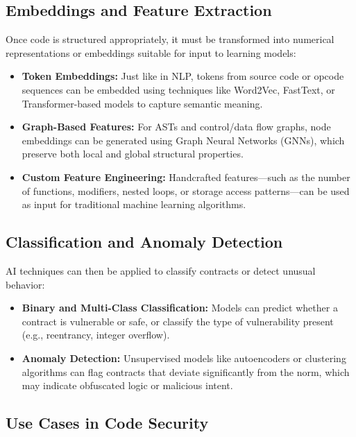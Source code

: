 \subsection{Embeddings and Feature Extraction}

Once code is structured appropriately, it must be transformed into numerical representations or embeddings suitable for input to learning models:

\begin{itemize}
    \item \textbf{Token Embeddings:} Just like in NLP, tokens from source code or opcode sequences can be embedded using techniques like Word2Vec, FastText, or Transformer-based models to capture semantic meaning.
    
    \item \textbf{Graph-Based Features:} For ASTs and control/data flow graphs, node embeddings can be generated using Graph Neural Networks (GNNs), which preserve both local and global structural properties.
    
    \item \textbf{Custom Feature Engineering:} Handcrafted features—such as the number of functions, modifiers, nested loops, or storage access patterns—can be used as input for traditional machine learning algorithms.
\end{itemize}

\subsection{Classification and Anomaly Detection}

AI techniques can then be applied to classify contracts or detect unusual behavior:

\begin{itemize}
    \item \textbf{Binary and Multi-Class Classification:} Models can predict whether a contract is vulnerable or safe, or classify the type of vulnerability present (e.g., reentrancy, integer overflow).
    
    \item \textbf{Anomaly Detection:} Unsupervised models like autoencoders or clustering algorithms can flag contracts that deviate significantly from the norm, which may indicate obfuscated logic or malicious intent.
\end{itemize}

\subsection{Use Cases in Code Security}

